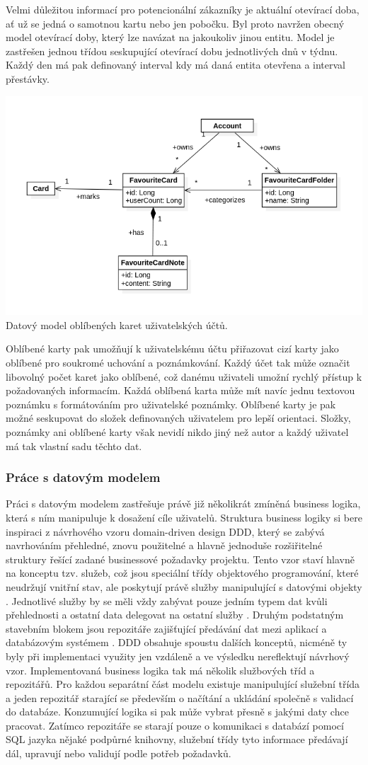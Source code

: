 \begin{itemize}
\begin{itemize}
		Velmi důležitou informací pro potencionální zákazníky je aktuální otevírací doba, ať už se jedná o samotnou kartu nebo
		jen pobočku.
		Byl proto navržen obecný model otevírací doby, který lze navázat na jakoukoliv jinou entitu.
		Model je zastřešen jednou třídou seskupující otevírací dobu jednotlivých dnů v týdnu.
		Každý den má pak definovaný interval kdy má daná entita otevřena a interval přestávky.

		\includegraphics[width=0.24\linewidth]{obrazky/datovy_model_oblibene_karty}\hfill
		Datový model oblíbených karet uživatelských účtů.

		Oblíbené karty pak umožňují k uživatelskému účtu přiřazovat cizí karty jako oblíbené pro soukromé uchování a
		poznámkování.
		Každý účet tak může označit libovolný počet karet jako oblíbené, což danému uživateli umožní rychlý přístup
		k požadovaných informacím.
		Každá oblíbená karta může mít navíc jednu textovou poznámku s formátováním pro uživatelské poznámky.
		Oblíbené karty je pak možné seskupovat do složek definovaných uživatelem pro lepší orientaci.
		Složky, poznámky ani oblíbené karty však nevidí nikdo jiný než autor a každý uživatel má tak vlastní sadu těchto dat.

		\subsubsection{Práce s datovým modelem}

		Práci s datovým modelem zastřešuje právě již několikrát zmíněná business logika, která s ním manipuluje k dosažení
		cíle uživatelů.
		Struktura business logiky si bere inspiraci z návrhového vzoru domain-driven design \ac{DDD}, který se zabývá
		navrhováním přehledné, znovu použitelné a hlavně jednoduše rozšiřitelné struktury řešící zadané businessové požadavky
		projektu.
		Tento vzor staví hlavně na konceptu tzv. služeb, což jsou speciální třídy objektového programování, které
		neudržují vnitřní stav, ale poskytují právě služby manipulující s datovými objekty \cite{ddd_quickly}.
		Jednotlivé služby by se měli vždy zabývat pouze jedním typem dat kvůli přehlednosti a ostatní data delegovat na
		ostatní služby \cite{ddd_quickly}.
		Druhým podstatným stavebním blokem jsou repozitáře zajišťující předávání dat mezi aplikací a databázovým systémem
		\cite{ddd_quickly}.
		\ac{DDD} obsahuje spoustu dalších konceptů, nicméně ty byly při implementaci využity jen vzdáleně a ve výsledku
		nereflektují návrhový vzor.
		Implementovaná business logika tak má několik službových tříd a repozitářů.
		Pro každou separátní část modelu existuje manipulující služební třída a jeden repozitář starající se především o
		načítání a ukládání společně s validací do databáze.
		Konzumující logika si pak může vybrat přesně s jakými daty chce pracovat.
		Zatímco repozitáře se starají pouze o komunikaci s databází pomocí \ac{SQL} jazyka nějaké podpůrné knihovny,
		služební třídy tyto informace předávají dál, upravují nebo validují podle potřeb požadavků.


\end{itemize}
\end{itemize}
